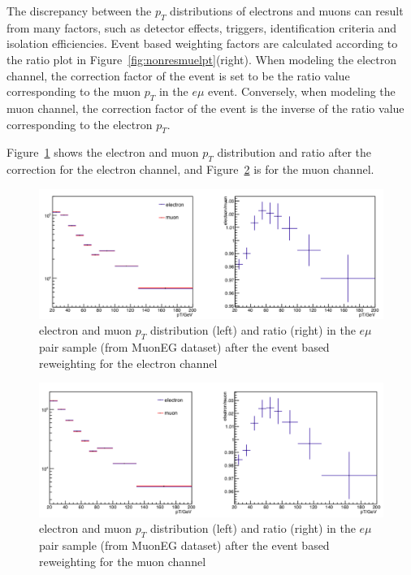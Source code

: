 \vspace{0.3cm}
The discrepancy between the $p_T$ distributions of electrons and muons can result from many factors, such as detector effects, triggers, identification criteria and isolation efficiencies. Event based weighting factors are calculated according to the ratio plot in Figure~\ref{fig:nonresmuelpt}(right). When modeling the electron channel, the correction factor of the event is set to be the ratio value corresponding to the muon $p_T$ in the $e\mu$ event. Conversely, when modeling the muon channel, the correction factor of the event is the inverse of the ratio value corresponding to the electron $p_T$.

\vspace{0.3cm}
Figure~\ref{fig:nonresmuelptel} shows the electron and muon $p_T$ distribution and ratio after the correction for the electron channel, and Figure~\ref{fig:nonresmuelptmu} is for the muon channel.

\begin{figure}[htbp]
\begin{center}
\includegraphics[width=0.95\linewidth]{figures/nonresmuelptel.png}
\caption{electron and muon $p_T$ distribution (left) and ratio (right) in the $e\mu$ pair sample (from MuonEG dataset) after the event based reweighting for the electron channel}
\label{fig:nonresmuelptel}
\end{center}
\end{figure}

\begin{figure}[htbp]
\begin{center}
\includegraphics[width=0.95\linewidth]{figures/nonresmuelptmu.png}
\caption{electron and muon $p_T$ distribution (left) and ratio (right) in the $e\mu$ pair sample (from MuonEG dataset) after the event based reweighting for the muon channel}
\label{fig:nonresmuelptmu}
\end{center}
\end{figure}

